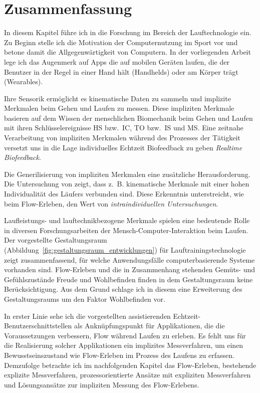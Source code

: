 

\section{Zusammenfassung} 

\label{sec:zusammenfassung_2}

In diesem Kapitel führe ich in die Forschung im Bereich der Lauftechnologie ein. Zu Beginn stelle ich die Motivation der Computernutzung im Sport vor und betone damit die Allgegenwärtigkeit von Computern. In der vorliegenden Arbeit lege ich das Augenmerk auf Apps die auf mobilen Geräten laufen, die der Benutzer in der Regel in einer Hand hält (Handhelds) oder am Körper trägt (Wearables).

Ihre Sensorik ermöglicht es kinematische Daten zu sammeln und implizite Merkmalen beim Gehen und Laufen zu messen. Diese impliziten Merkmale basieren auf dem Wissen der menschlichen Biomechanik beim Gehen und Laufen mit ihren Schlüsselereignisse \ac{HS} bzw.\ \ac{IC}, \ac{TO} bzw.\ \ac{IS} und \ac{MS}. Eine zeitnahe Verarbeitung von impliziten Merkmalen während des Prozesses der Tätigkeit versetzt uns in die Lage individuelles Echtzeit Biofeedback zu geben \emph{Realtime Biofeedback}. 

Die Generilisierung von impliziten Merkmalen eine zusätzliche Herausforderung. Die Untersuchung von \citet{Strohrmann2012} zeigt, dass z.~B. kinematische Merkmale mit einer hohen Individualität des Läufers verbunden sind. Diese Erkenntnis unterstreicht, wie beim Flow-Erleben, den Wert von \emph{intraindividuellen Untersuchungen}.

Laufleistungs- und lauftechnikbezogene Merkmale spielen eine bedeutende Rolle in diversen Forschungsarbeiten der Mensch-Computer-Interaktion beim Laufen. Der vorgestellte Gestaltungsraum (Abbildung~\ref{fig:gestaltungsraum_entwicklungen}) für Lauftrainingstechnologie zeigt zusammenfassend, für welche Anwendungsfälle computerbasierende Systeme vorhanden sind. Flow-Erleben und die in Zusammenhang stehenden Gemüts- und Gefühlszustände Freude und Wohlbefinden finden in dem Gestaltungsraum keine Berücksichtigung. Aus dem Grund schlage ich in diesem eine Erweiterung des Gestaltungsraums um den Faktor Wohlbefinden vor.

In erster Linie sehe ich die vorgestellten assistierenden Echtzeit-Benutzerschnittstellen als Anknüpfungspunkt für Applikationen, die die Voraussetzungen verbessern, Flow während Laufen zu erleben. Es fehlt uns für die Realisierung solcher Applikationen ein implizites Messverfahren, um einen Bewusstseinszustand wie Flow-Erleben im Prozess des Laufens zu erfassen. Demzufolge betrachte ich im nachfolgenden Kapitel das Flow-Erleben, bestehende explizite Messverfahren, prozessorientierte Ansätze mit expliziten Messverfahren und Lösungsansätze zur impliziten Messung des Flow-Erlebens.


